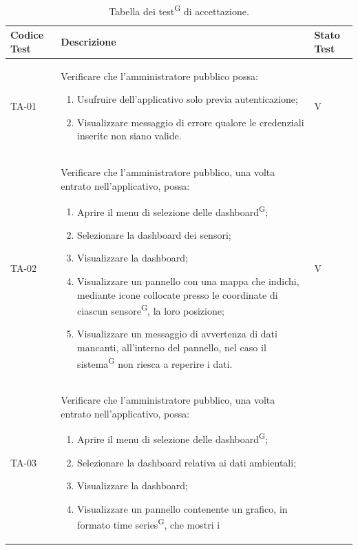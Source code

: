 \documentclass[8pt]{article}
\newcommand{\glossterm}[1]{#1\textsuperscript{G}} %
\begin{document}
\renewcommand{\arraystretch}{2.5}
\begin{longtable}{|>{\centering}p{2cm}|>{\RaggedRight}m{12cm}|>{\centering\arraybackslash}p{2cm}|}
    \hline
    \rowcolor{white}
    \textbf{Codice Test} & \textbf{Descrizione} & \textbf{Stato Test} \\
    \hline
    \endfirsthead 
    \rowcolor{white}
    \caption{Tabella dei \glossterm{test} di accettazione.} 
    \label{table:Tabella dei test di accettazione}
    \endlastfoot  
    TA-01 & Verificare che l'amministratore pubblico possa:
    \begin{enumerate}
        \setlength\itemsep{0em}
        \item Usufruire dell’applicativo solo previa autenticazione;
        \item Visualizzare messaggio di errore qualore le credenziali inserite non siano valide.
    \end{enumerate} & V \\
    \hline
    TA-02 & Verificare che l'amministratore pubblico, una volta entrato nell'applicativo, possa:
    \begin{enumerate}
        \setlength\itemsep{0em}
        \item Aprire il menu di selezione delle \glossterm{dashboard};
        \item Selezionare la dashboard dei sensori;
        \item Visualizzare la dashboard;
        \item Visualizzare un pannello con una mappa che indichi, mediante icone collocate presso le coordinate di ciascun \glossterm{sensore}, la loro posizione;
        \item Visualizzare un messaggio di avvertenza di dati mancanti, all’interno del pannello, nel caso il \glossterm{sistema} non riesca a reperire i dati.
    \end{enumerate}
    & V \\
    \hline
    TA-03 & Verificare che l'amministratore pubblico, una volta entrato nell'applicativo, possa:
    \begin{enumerate}
        \setlength\itemsep{0em}
        \item Aprire il menu di selezione delle \glossterm{dashboard};
        \item Selezionare la dashboard relativa ai dati ambientali;
        \item Visualizzare la dashboard;
        \item Visualizzare un pannello contenente un grafico, in formato \glossterm{time series}, che mostri i

\end{enumerate}
\end{longtable}
\end{document}
